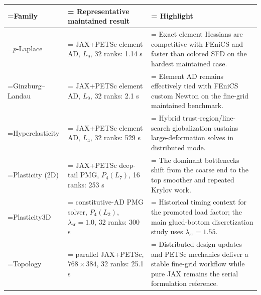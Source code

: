 \begin{tabularx}{\textwidth}{@{}>{\hsize=0.471\hsize\linewidth=\hsize\RaggedRight\arraybackslash}X>{\hsize=1.074\hsize\linewidth=\hsize\RaggedRight\arraybackslash}X>{\hsize=1.455\hsize\linewidth=\hsize\RaggedRight\arraybackslash}X@{}}
\toprule
Family & Representative maintained result & Highlight \\
\midrule
$p$-Laplace & JAX+PETSc element AD, $L_{9}$, 32 ranks: \num{1.14} s & Exact element Hessians are competitive with FEniCS and faster than colored SFD on the hardest maintained case. \\
Ginzburg--Landau & JAX+PETSc element AD, $L_{9}$, 32 ranks: \num{2.1} s & Element AD remains effectively tied with FEniCS custom Newton on the fine-grid maintained benchmark. \\
Hyperelasticity & JAX+PETSc element AD, $L_{4}$, 32 ranks: \num{529} s & Hybrid trust-region/line-search globalization sustains large-deformation solves in distributed mode. \\
Plasticity (2D) & JAX+PETSc deep-tail PMG, $P_{4}(L_{7})$, 16 ranks: \num{253} s & The dominant bottlenecks shift from the coarse end to the top smoother and repeated Krylov work. \\
Plasticity3D & constitutive-AD PMG solver, $P_{4}(L_{2})$, $\lambda_{\mathrm{sr}}=\num{1.0}$, 32 ranks: \num{300} s & Historical timing context for the promoted load factor; the main glued-bottom discretization study uses $\lambda_{\mathrm{sr}}=\num{1.55}$. \\
Topology & parallel JAX+PETSc, $768\times384$, 32 ranks: \num{25.1} s & Distributed design updates and PETSc mechanics deliver a stable fine-grid workflow while pure JAX remains the serial formulation reference. \\
\bottomrule
\end{tabularx}
